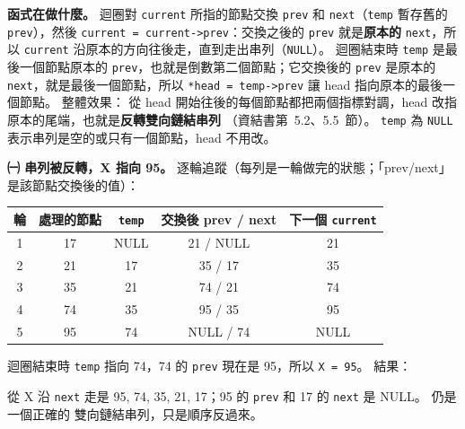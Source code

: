 \begin{pastsoln}
\textbf{函式在做什麼。} 迴圈對 \texttt{current} 所指的節點交換 \texttt{prev} 和 \texttt{next}（\texttt{temp}
暫存舊的 \texttt{prev}），然後 \texttt{current = current->prev}：交換之後的 \texttt{prev} 就是\textbf{原本的}
\texttt{next}，所以 \texttt{current} 沿原本的方向往後走，直到走出串列（\texttt{NULL}）。 迴圈結束時
\texttt{temp} 是最後一個節點原本的 \texttt{prev}，也就是倒數第二個節點；它交換後的 \texttt{prev} 是原本的
\texttt{next}，就是最後一個節點，所以 \texttt{*head = temp->prev} 讓 head 指向原本的最後一個節點。 整體效果：
從 head 開始往後的每個節點都把兩個指標對調，head 改指原本的尾端，也就是\textbf{反轉雙向鏈結串列}
（資結書第~5.2、5.5~節）。 \texttt{temp} 為 \texttt{NULL} 表示串列是空的或只有一個節點，head 不用改。

\textbf{㈠ 串列被反轉，X 指向 95。} 逐輪追蹤（每列是一輪做完的狀態；「prev/next」是該節點交換後的值）：
\begin{center}
\begin{tabular}{ccccc}
\toprule
輪 & 處理的節點 & \texttt{temp} & 交換後 prev / next & 下一個 \texttt{current} \\
\midrule
1 & 17 & NULL & 21 / NULL & 21 \\
2 & 21 & 17 & 35 / 17 & 35 \\
3 & 35 & 21 & 74 / 21 & 74 \\
4 & 74 & 35 & 95 / 35 & 95 \\
5 & 95 & 74 & NULL / 74 & NULL \\
\bottomrule
\end{tabular}
\end{center}
迴圈結束時 \texttt{temp} 指向 74，74 的 \texttt{prev} 現在是 95，所以 \texttt{X = 95}。 結果：
\begin{center}
\end{center}
從 X 沿 \texttt{next} 走是 95, 74, 35, 21, 17；95 的 \texttt{prev} 和 17 的 \texttt{next} 是 NULL。 仍是一個正確的
雙向鏈結串列，只是順序反過來。


\end{pastsoln}
